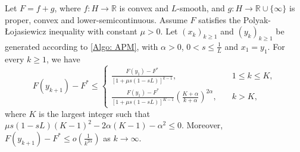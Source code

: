 \documentclass[onefignum,onetabnum]{siamart220329}
\begin{document}
\begin{theorem}
Let $F=f+g$, where $f:H\to\mathbb{R}$ is convex and $L$-smooth, and $g:H\to\mathbb{R}\cup\{\infty\}$ is proper, convex and lower-semicontinuous. Assume $F$ satisfies the Polyak-\L ojasiewicz inequality with constant $\mu>0$. Let $(x_k)_{k\ge 1}$ and $(y_k)_{k\ge 1}$ be generated according to \eqref{Algo: APM}, with
$\alpha>0$, $0 < s \le \frac{1}{L}$ and $x_1 = y_1$. For every $k\ge 1$, we have
\begin{equation*}
F(y_{k+1}) - F^*\le\left\{
\begin{array}{ll}
\frac{ F(y_1) - F^* }{ \left[ 1 + \mu s (1-sL) \right]^{k-1} },&\quad 1\le k \le K,\\ [5pt]
\frac{F(y_1) - F^*}{\left[ 1 + \mu s (1-sL) \right]^{K-1} } \left( \frac{K+\alpha}{k+\alpha} \right)^{2\alpha},&\quad k> K,
\end{array}
\right.
\end{equation*}
where $K$ is the largest integer such that $\mu s (1-sL)(K-1)^2-2\alpha(K-1)-\alpha^2\le 0$. Moreover, $F(y_{k+1}) - F^* \le o( \frac{1}{k^{2\alpha}})$ as $k\to\infty$.
\end{theorem}
\end{document}
